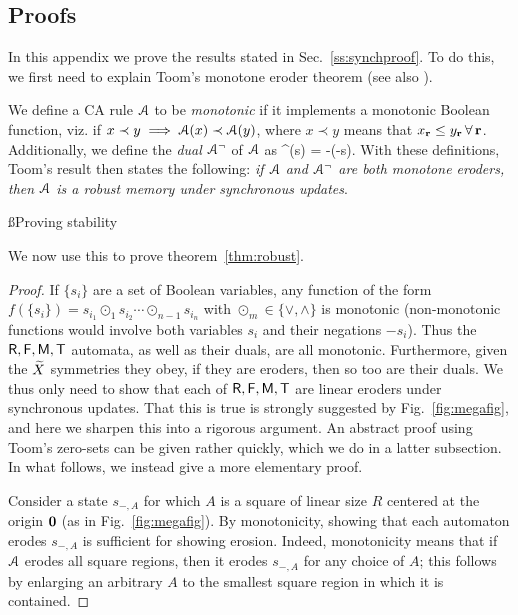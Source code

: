 \documentclass[pra,aps,twocolumn,groupedaddress,superscriptaddress,nofootinbib,preprintnumbers]{revtex4-2}
\begin{document}
\begin{widetext}
		
		\section{Proofs}\label{app:proof}
		
		In this appendix we prove the results stated in Sec.~\ref{ss:synchproof}. To do this, we first need to explain Toom's monotone eroder theorem \cite{toom1980stable} (see also \cite{pajouheshgar2025exploring}). 
		
		We define a CA rule $\mathcal{A}$ to be {\it monotonic} if it implements a monotonic Boolean function, viz. if $x \prec y \implies \mathcal{A}(x) \prec \mathcal{A}(y)$, where $x \prec y$ means that $x_{\mathbf{r}} \leq y_{\mathbf{r}} \, \forall \, \mathbf{r}$. Additionally, we define the {\it dual} $\mathcal{A}^\neg$ of $\mathcal{A}$ as 
		\be  \label{dualdef} \mca^\neg(s) = -\mca(-s).\ee 
		With these definitions, Toom's result \cite{toom1980stable} then states the following: {\it if $\mathcal{A}$ and $\mathcal{A}^\neg$ are both monotone eroders, then $\mathcal{A}$ is a robust memory under synchronous updates}. 
		
		\ss{Proving stability}
		
		We now use this to prove theorem~\ref{thm:robust}. 
		
		\begin{proof} 
			If $\{s_i\}$ are a set of Boolean variables, any function of the form $f(\{s_i\}) = s_{i_1} \odot_1 s_{i_2} \cdots\odot_{n-1} s_{i_n}$ with $\odot_m \in \{\vee,\wedge\}$ is monotonic (non-monotonic functions would involve both variables $s_i$ and their negations $-s_i$). Thus the $\mathsf{R},\mathsf{F},\mathsf{M},\mathsf{T}$ automata, as well as their duals, are all monotonic. Furthermore, given the $\widetilde X$ symmetries they obey, if they are eroders, then so too are their duals. We thus only need to show that each of $\mathsf{R},\mathsf{F},\mathsf{M},\mathsf{T}$ are linear eroders under synchronous updates. That this is true is strongly suggested by Fig.~\ref{fig:megafig}, and here we sharpen this into a rigorous argument. 	
			An abstract proof using Toom's zero-sets can be given rather quickly, which we do in a latter subsection. In what follows, we instead give a more elementary proof. 
			
			Consider a state $s_{-,A}$ for which $A$ is a square of linear size $R$ centered at the origin ${\mathbf{0}}$ (as in Fig.~\ref{fig:megafig}). By monotonicity, showing that each automaton erodes $s_{-,A}$ is sufficient for showing erosion. Indeed, monotonicity means that if $\mathcal{A}$ erodes all square regions, then it erodes $s_{-,A}$ for any choice of $A$; this follows by enlarging an arbitrary $A$ to the smallest square region in which it is contained. 
			

\end{proof}
\end{widetext}
\end{document}
